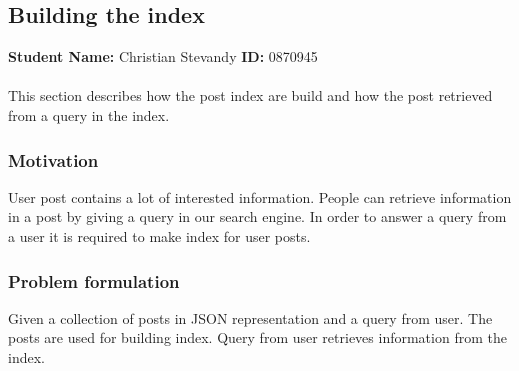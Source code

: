 \subsection{Building the index}
	\textbf{Student Name: }Christian Stevandy \textbf{ID:} 0870945\\\\
	This section describes how the post index are build and how the post retrieved from a query in the index.
\subsubsection*{Motivation}
	User post contains a lot of interested information. People can retrieve information in a post by giving a query in our search engine. In order to answer a query from a user it is required to make index for user posts.
\subsubsection*{Problem formulation}
	Given a collection of posts in JSON representation and a query from user. The posts are used for building index. Query from user retrieves information from the index.
